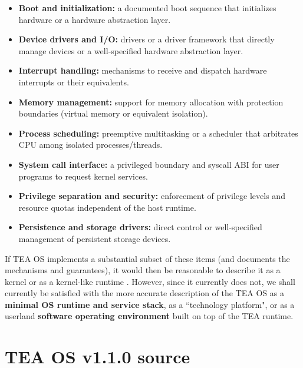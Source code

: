 \documentclass{article}
\begin{document}
\begin{itemize}
  \item \textbf{Boot and initialization:} a documented boot sequence that initializes hardware or a hardware abstraction layer.
  \item \textbf{Device drivers and I/O:} drivers or a driver framework that directly manage devices or a well‑specified hardware abstraction layer.
  \item \textbf{Interrupt handling:} mechanisms to receive and dispatch hardware interrupts or their equivalents.
  \item \textbf{Memory management:} support for memory allocation with protection boundaries (virtual memory or equivalent isolation).
  \item \textbf{Process scheduling:} preemptive multitasking or a scheduler that arbitrates CPU among isolated processes/threads.
  \item \textbf{System call interface:} a privileged boundary and syscall ABI for user programs to request kernel services.
  \item \textbf{Privilege separation and security:} enforcement of privilege levels and resource quotas independent of the host runtime.
  \item \textbf{Persistence and storage drivers:} direct control or well‑specified management of persistent storage devices.
\end{itemize}

If TEA OS implements a substantial subset of these items (and documents the mechanisms and guarantees), it would then be reasonable to describe it as a kernel or as a kernel‑like runtime \cite{copilot_assistant}. However, since it currently does not, we shall currently be satisfied with the more accurate description of the TEA OS as a \textbf{minimal OS runtime and service stack}, as a ``technology platform", or as a userland \textbf{software operating environment} built on top of the TEA runtime.



\section{TEA OS v1.1.0 source}
\label{SECTOSSRC}
\end{document}
